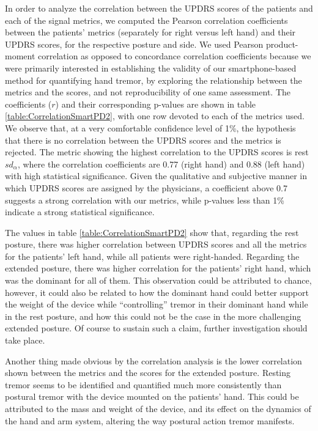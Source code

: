 In order to analyze the correlation between the \gls{UPDRS} scores of the patients and each of the signal metrics, we computed the Pearson correlation coefficients between the patients' metrics (separately for right versus left hand) and their \gls{UPDRS} scores, for the respective posture and side. We used Pearson product-moment correlation as opposed to concordance correlation coefficients because we were primarily interested in establishing the validity of our smartphone-based method for quantifying hand tremor, by exploring the relationship between the metrics and the scores, and not reproducibility of one same assessment. The coefficients ($r$) and their corresponding p-values are shown in table \ref{table:CorrelationSmartPD2}, with one row devoted to each of the metrics used. We observe that, at a very comfortable confidence level of 1\%, the hypothesis that there is no correlation between the UPDRS scores and the metrics is rejected. The metric showing the highest correlation to the UPDRS scores is rest $sd_{\alpha}$, where the correlation coefficients are 0.77 (right hand) and 0.88 (left hand) with high statistical significance. Given the qualitative and subjective manner in which \gls{UPDRS} scores are assigned by the physicians, a coefficient above 0.7 suggests a strong correlation with our metrics, while p-values less than 1\% indicate a strong statistical significance.

The values in table \ref{table:CorrelationSmartPD2} show that, regarding the rest posture, there was higher correlation between \gls{UPDRS} scores and all the metrics for the patients' left hand, while all patients were right-handed. Regarding the extended posture, there was higher correlation for the patients' right hand, which was the dominant for all of them. This observation could be attributed to chance, however, it could also be related to how the dominant hand could better support the weight of the device while ``controlling'' tremor in their dominant hand while in the rest posture, and how this could not be the case in the more challenging extended posture. Of course to sustain such a claim, further investigation should take place. 

Another thing made obvious by the correlation analysis is the lower correlation shown between the metrics and the scores for the extended posture. Resting tremor seems to be identified and quantified much more consistently than postural tremor with the device mounted on the patients' hand. This could be attributed to the mass and weight of the device, and its effect on the dynamics of the hand and arm system, altering the way postural action tremor manifests. 

